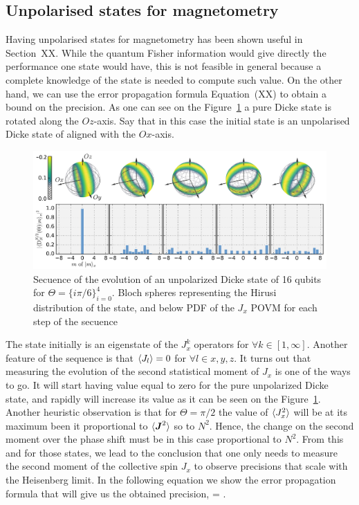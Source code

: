 \subsection{Unpolarised states for magnetometry}

Having unpolarised states for magnetometry has been shown useful in Section~XX.
While the quantum Fisher information would give directly the performance one state would have, this is not feasible in general because a complete knowledge of the state is needed to compute such value.
On the other hand, we can use the error propagation formula Equation~(XX) to obtain a bound on the precision.
As one can see on the Figure~\ref{fig:vd-secuence-evo} a pure Dicke state is rotated along the $Oz$-axis.
Say that in this case the initial state is an unpolarised Dicke state of aligned with the $Ox$-axis.
\begin{figure}
  \centering
  \includegraphics[scale=.65]{img/plots/VD_evolution_of_dicke.pdf}
  \caption{Secuence of the evolution of an unpolarized Dicke state of 16 qubits for $\Theta=\{i\pi/6\}_{i=0}^4$. Bloch spheres representing the Hirusi distribution of the state, and below PDF of the $J_x$ POVM for each step of the secuence}
  \label{fig:vd-secuence-evo}
\end{figure}

The state initially is an eigenstate of the $J_x^k$ operators for $\forall k \in [1,\infty]$.
Another feature of the sequence is that $\langle J_l \rangle=0$ for $\forall l\in x,y,z$.
It turns out that measuring the evolution of the second statistical moment of $J_x$ is one of the ways to go.
It will start having value equal to zero for the pure unpolarized Dicke state, and rapidly will increase its value as it can be seen on the Figure~\ref{fig:vd-secuence-evo}.
Another heuristic observation is that for $\Theta=\pi/2$ the value of $\langle J_x^2 \rangle$ will be at its maximum been it proportional to $\langle \boldsymbol{J}^2 \rangle$ so to $N^2$.
Hence, the change on the second moment over the phase shift must be in this case proportional to $N^2$.
From this and for those states, we lead to the conclusion that one only needs to measure the second moment of the collective spin $J_x$ to observe precisions that scale with the Heisenberg limit.
In the following equation we show the error propagation formula that will give us the obtained precision,
\be
  \varian{\Theta} = .
  \label{eq:vd-error-propagation}
\ee

